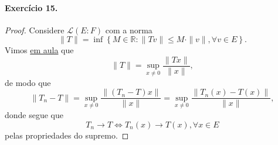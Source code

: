 \documentclass[12pt,a4paper]{article}
\begin{document}
\paragraph{Exercício 15.}
\begin{proof}
Considere $\mathcal{L}(E:F)$ com a norma
\begin{equation*}
    \|T\| = \inf\left\{ M \in \mathbb{R} : \|Tv\| \leq M\cdot\|v\|, \forall v \in E \right\}.
\end{equation*}
Vimos \href{https://www.youtube.com/watch?v=Jl1BRX26g8g}{em aula} que 
\begin{equation*}
    \|T\| = \sup_{x\neq 0} \frac{\|Tx\|}{\|x\|},
\end{equation*}
de modo que
\begin{equation*}
    \|T_n - T\| = \sup_{x\neq 0} \frac{\|(T_n - T)x\|}{\|x\|} = \sup_{x\neq 0} \frac{\|T_n(x) - T(x)\|}{\|x\|},
\end{equation*}
donde segue que
\begin{equation*}
    T_n \to T \iff T_n(x) \to T(x), \forall x\in E
\end{equation*}
pelas propriedades do supremo.
\end{proof}
\end{document}
